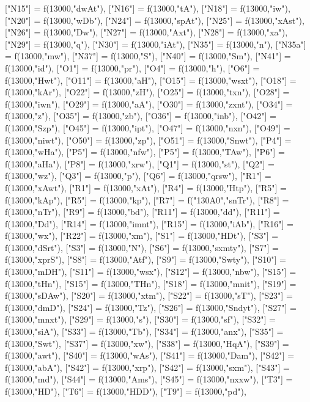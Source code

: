\documentclass{article}
\begin{document}
\begin{luacode*}
{	["N15"] = f(13000,"dwAt"),
	["N16"] = f(13000,"tA"),
	["N18"] = f(13000,"iw"),
	["N20"] = f(13000,"wDb"),
	["N24"] = f(13000,"spAt"),
	["N25"] = f(13000,"xAst"),
	["N26"] = f(13000,"Dw"),
	["N27"] = f(13000,"Axt"),
	["N28"] = f(13000,"xa"),
	["N29"] = f(13000,"q"),
	["N30"] = f(13000,"iAt"),
	["N35"] = f(13000,"n"),
	["N35a"] = f(13000,"mw"),
	["N37"] = f(13000,"S"),
	["N40"] = f(13000,"Sm"),
	["N41"] = f(13000,"id"),
	["O1"] = f(13000,"pr"),
	["O4"] = f(13000,"h"),
	["O6"] = f(13000,"Hwt"),
	["O11"] = f(13000,"aH"),
	["O15"] = f(13000,"wsxt"),
	["O18"] = f(13000,"kAr"),
	["O22"] = f(13000,"zH"),
	["O25"] = f(13000,"txn"),
	["O28"] = f(13000,"iwn"),
	["O29"] = f(13000,"aA"),
	["O30"] = f(13000,"zxnt"),
	["O34"] = f(13000,"z"),
	["O35"] = f(13000,"zb"),
	["O36"] = f(13000,"inb"),
	["O42"] = f(13000,"Szp"),
	["O45"] = f(13000,"ipt"),
	["O47"] = f(13000,"nxn"),
	["O49"] = f(13000,"niwt"),
	["O50"] = f(13000,"zp"),
	["O51"] = f(13000,"Snwt"),
	["P4"] = f(13000,"wHa"),
	["P5"] = f(13000,"nfw"),
	["P5"] = f(13000,"TAw"),
	["P6"] = f(13000,"aHa"),
	["P8"] = f(13000,"xrw"),
	["Q1"] = f(13000,"st"),
	["Q2"] = f(13000,"wz"),
	["Q3"] = f(13000,"p"),
	["Q6"] = f(13000,"qrsw"),
	["R1"] = f(13000,"xAwt"),
	["R1"] = f(13000,"xAt"),
	["R4"] = f(13000,"Htp"),
	["R5"] = f(13000,"kAp"),
	["R5"] = f(13000,"kp"),
	["R7"] = f("130A0","snTr"),
	["R8"] = f(13000,"nTr"),
	["R9"] = f(13000,"bd"),
	["R11"] = f(13000,"dd"),
	["R11"] = f(13000,"Dd"),
	["R14"] = f(13000,"imnt"),
	["R15"] = f(13000,"iAb"),
	["R16"] = f(13000,"wx"),
	["R22"] = f(13000,"xm"),
	["S1"] = f(13000,"HDt"),
	["S3"] = f(13000,"dSrt"),
	["S3"] = f(13000,"N"),
	["S6"] = f(13000,"sxmty"),
	["S7"] = f(13000,"xprS"),
	["S8"] = f(13000,"Atf"),
	["S9"] = f(13000,"Swty"),
	["S10"] = f(13000,"mDH"),
	["S11"] = f(13000,"wsx"),
	["S12"] = f(13000,"nbw"),
	["S15"] = f(13000,"tHn"),
	["S15"] = f(13000,"THn"),
	["S18"] = f(13000,"mnit"),
	["S19"] = f(13000,"sDAw"),
	["S20"] = f(13000,"xtm"),
	["S22"] = f(13000,"sT"),
	["S23"] = f(13000,"dmD"),
	["S24"] = f(13000,"Tz"),
	["S26"] = f(13000,"Sndyt"),
	["S27"] = f(13000,"mnxt"),
	["S29"] = f(13000,"s"),
	["S30"] = f(13000,"sf"),
	["S32"] = f(13000,"siA"),
	["S33"] = f(13000,"Tb"),
	["S34"] = f(13000,"anx"),
	["S35"] = f(13000,"Swt"),
	["S37"] = f(13000,"xw"),
	["S38"] = f(13000,"HqA"),
	["S39"] = f(13000,"awt"),
	["S40"] = f(13000,"wAs"),
	["S41"] = f(13000,"Dam"),
	["S42"] = f(13000,"abA"),
	["S42"] = f(13000,"xrp"),
	["S42"] = f(13000,"sxm"),
	["S43"] = f(13000,"md"),
	["S44"] = f(13000,"Ams"),
	["S45"] = f(13000,"nxxw"),
	["T3"] = f(13000,"HD"),
	["T6"] = f(13000,"HDD"),
	["T9"] = f(13000,"pd"),
}
\end{luacode*}
\end{document}
